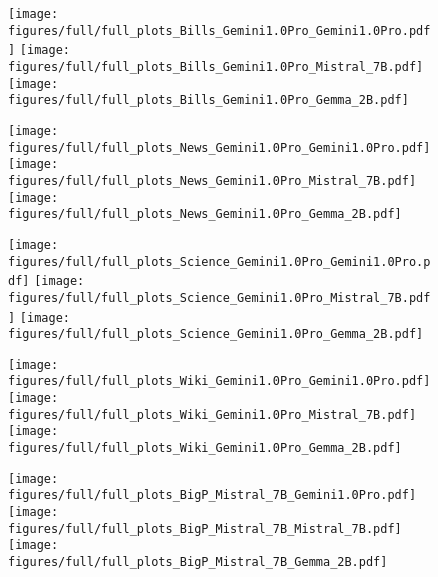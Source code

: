 \begin{figure}[H]
    \centering
    \texttt{[image: figures/full/full\_plots\_Bills\_Gemini1.0Pro\_Gemini1.0Pro.pdf]}
    \texttt{[image: figures/full/full\_plots\_Bills\_Gemini1.0Pro\_Mistral\_7B.pdf]}
    \texttt{[image: figures/full/full\_plots\_Bills\_Gemini1.0Pro\_Gemma\_2B.pdf]}
    \label{fig:full_gemini_bills}
\end{figure}

\begin{figure}[H]
    \centering
    \texttt{[image: figures/full/full\_plots\_News\_Gemini1.0Pro\_Gemini1.0Pro.pdf]}
    \texttt{[image: figures/full/full\_plots\_News\_Gemini1.0Pro\_Mistral\_7B.pdf]}
    \texttt{[image: figures/full/full\_plots\_News\_Gemini1.0Pro\_Gemma\_2B.pdf]}
    \label{fig:full_gemini_news}
\end{figure}

\begin{figure}[H]
    \centering
    \texttt{[image: figures/full/full\_plots\_Science\_Gemini1.0Pro\_Gemini1.0Pro.pdf]}
    \texttt{[image: figures/full/full\_plots\_Science\_Gemini1.0Pro\_Mistral\_7B.pdf]}
    \texttt{[image: figures/full/full\_plots\_Science\_Gemini1.0Pro\_Gemma\_2B.pdf]}
    \label{fig:full_gemini_science}
\end{figure}

\begin{figure}[H]
    \centering
    \texttt{[image: figures/full/full\_plots\_Wiki\_Gemini1.0Pro\_Gemini1.0Pro.pdf]}
    \texttt{[image: figures/full/full\_plots\_Wiki\_Gemini1.0Pro\_Mistral\_7B.pdf]}
    \texttt{[image: figures/full/full\_plots\_Wiki\_Gemini1.0Pro\_Gemma\_2B.pdf]}
    \label{fig:full_gemini_wiki}
\end{figure}


\begin{figure}[H]
    \centering
    \texttt{[image: figures/full/full\_plots\_BigP\_Mistral\_7B\_Gemini1.0Pro.pdf]}
    \texttt{[image: figures/full/full\_plots\_BigP\_Mistral\_7B\_Mistral\_7B.pdf]}
    \texttt{[image: figures/full/full\_plots\_BigP\_Mistral\_7B\_Gemma\_2B.pdf]}
    \label{fig:full_mistral_bigp}
\end{figure}

